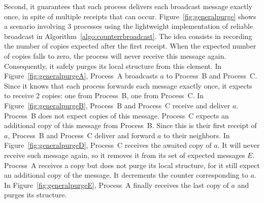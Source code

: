 Second, it guarantees that each process delivers each broadcast message exactly
once, in spite of multiple receipts that can occur.
Figure~\ref{fig:generalpurge} shows a scenario involving 3 processes using the
lightweight implementation of reliable broadcast in
Algorithm~\ref{algo:counterrbroadcast}.  The idea consists in recording the
number of copies expected after the first receipt. When the expected number of
copies falls to zero, the process will never receive this message
again. Consequently, it safely purges its local structure from this element. In
Figure~\ref{fig:generalpurgeA}, Process~A broadcasts $a$ to Process~B and
Process~C. Since it knows that each process forwards each message exactly once,
it expects to receive 2 copies: one from Process~B, one from Process~C. In
Figure~\ref{fig:generalpurgeB}, Process~B and Process~C receive and deliver
$a$. Process~B does not expect copies of this message. Process~C expects an
additional copy of this message from Process~B.  Since this is their first
receipt of $a$, Process~B and Process~C deliver and forward $a$ to their
neighbors. In Figure~\ref{fig:generalpurgeD}, Process~C receives the awaited
copy of $a$. It will never receive such message again, so it removes it from its
set of expected messages $E$. Process~A receives a copy but does not purge its
local structure, for it still expect an additional copy of the message. It
decrements the counter corresponding to $a$. In Figure~\ref{fig:generalpurgeE},
Process~A finally receives the last copy of $a$ and purges its structure.

